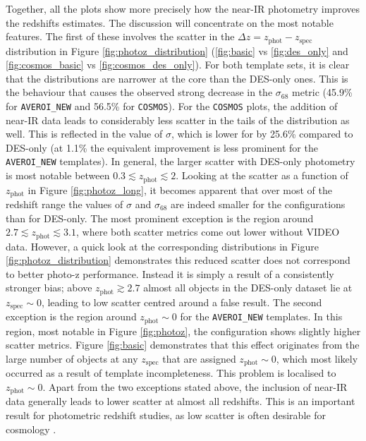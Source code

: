 Together, all the plots show more precisely how the near-IR photometry improves the redshifts estimates. The discussion will concentrate on the most notable features. The first of these involves the scatter in the $\Delta z= z_{\mathrm{phot}} - z_{\mathrm{spec}}$ distribution in Figure \ref{fig:photoz_distribution} (\ref{fig:basic} vs \ref{fig:des_only} and \ref{fig:cosmos_basic} vs \ref{fig:cosmos_des_only}). For both template sets, it is clear that the \DESVIDEO distributions are narrower at the core than the DES-only ones. This is the behaviour that causes the observed strong decrease in the $\sigma_{68}$ metric (45.9\% for \texttt{AVEROI\_NEW} and 56.5\% for \texttt{COSMOS}). For the \texttt{COSMOS} plots, the addition of near-IR data leads to considerably less scatter in the tails of the distribution as well. This is reflected in the value of $\sigma$, which is lower for \DESVIDEO by 25.6\% compared to DES-only (at 1.1\% the equivalent improvement is less prominent for the \texttt{AVEROI\_NEW} templates). In general, the larger scatter with DES-only photometry is most notable between $0.3\lesssim z_{\mathrm{phot}} \lesssim 2$. Looking at the scatter as a function of $z_{\mathrm{phot}}$ in Figure \ref{fig:photoz_long}, it becomes apparent that over most of the redshift range the values of $\sigma$ and $\sigma_{68}$ are indeed smaller for the \DESVIDEO configurations than for DES-only. The most prominent exception is the region around $2.7\lesssim z_{\mathrm{phot}} \lesssim3.1$, where  both scatter metrics come out lower without VIDEO data. However, a quick look at the corresponding distributions in Figure \ref{fig:photoz_distribution} demonstrates this reduced scatter does not correspond to better photo-z performance. Instead it is simply a result of a consistently stronger bias; above $z_{\mathrm{phot}}\gtrsim 2.7$ almost all objects in the DES-only dataset lie at $z_{\mathrm{spec}}\sim0$, leading to low scatter centred around a false result. The second exception is the region around $z_{\mathrm{phot}} \sim 0$ for the \texttt{AVEROI\_NEW} templates. In this region, most notable in Figure \ref{fig:photoz}, the \DESVIDEO configuration shows slightly higher scatter metrics. Figure \ref{fig:basic} demonstrates that this effect originates from the large number of objects at any $z_{\mathrm{spec}}$ that are assigned $z_{\mathrm{phot}}\sim0$, which most likely occurred as a result of template incompleteness. This problem is localised to $z_{\mathrm{phot}}\sim0$. Apart from the two exceptions stated above, the inclusion of near-IR data generally leads to lower scatter at almost all redshifts. This is an important result for  photometric redshift studies, as low scatter is often desirable for cosmology \citep{2014MNRAS.445.1482S, 2008MNRAS.386.1219B, 2011MNRAS.414..329C, 2012MNRAS.420.3240N}. \par

